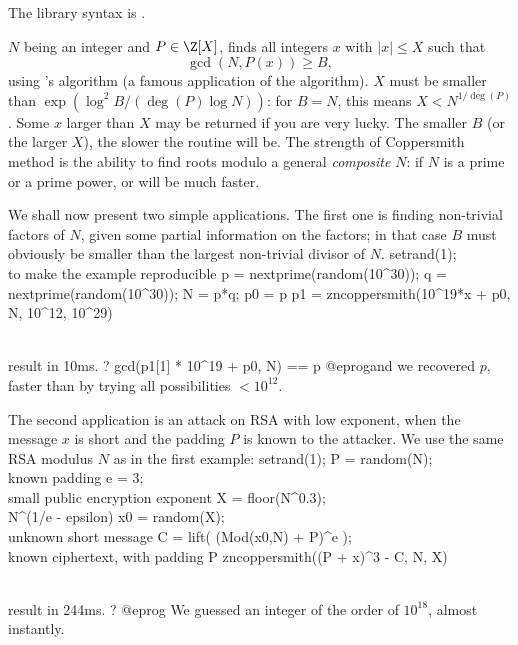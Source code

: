 The library syntax is .

\label{se:zncoppersmith}
$N$ being an integer and $P\in \Z[X]$, finds all integers $x$ with
$|x| \leq X$ such that
$$\gcd(N, P(x)) \geq B,$$
using 's algorithm (a famous application of the 
algorithm). $X$ must be smaller than $\exp(\log^2 B / (\deg(P) \log N))$:
for $B = N$, this means $X < N^{1/\deg(P)}$. Some $x$ larger than $X$ may
be returned if you are very lucky. The smaller $B$ (or the larger $X$), the
slower the routine will be. The strength of Coppersmith method is the
ability to find roots modulo a general \emph{composite} $N$: if $N$ is a prime
or a prime power,  or  will be much
faster.

We shall now present two simple applications. The first one is
finding non-trivial factors of $N$, given some partial information on the
factors; in that case $B$ must obviously be smaller than the largest
non-trivial divisor of $N$.
\bprog
setrand(1); \\ to make the example reproducible
p = nextprime(random(10^30));
q = nextprime(random(10^30)); N = p*q;
p0 = p %
p1 = zncoppersmith(10^19*x + p0, N, 10^12, 10^29)

\\ result in 10ms.
? gcd(p1[1] * 10^19 + p0, N) == p
@eprog\noindent and we recovered $p$, faster than by trying all
possibilities $ < 10^{12}$.

The second application is an attack on RSA with low exponent, when the
message $x$ is short and the padding $P$ is known to the attacker. We use
the same RSA modulus $N$ as in the first example:
\bprog
setrand(1);
P = random(N);    \\ known padding
e = 3;            \\ small public encryption exponent
X = floor(N^0.3); \\ N^(1/e - epsilon)
x0 = random(X);   \\ unknown short message
C = lift( (Mod(x0,N) + P)^e ); \\ known ciphertext, with padding P
zncoppersmith((P + x)^3 - C, N, X)

\\ result in 244ms.
? %
@eprog\noindent
We guessed an integer of the order of $10^{18}$, almost instantly.

